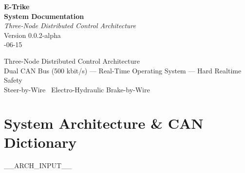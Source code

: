 \documentclass[12pt,a4paper,oneside]{report}
\begin{document}

\thispagestyle{empty}

\vspace*{60mm}

\begin{center}
  {\fontsize{28}{34}\selectfont\textbf{E-Trike}}\\[8mm]
  {\fontsize{22}{28}\selectfont\textbf{System Documentation}}\\[20mm]
  {\fontsize{14}{18}\selectfont\textit{Three-Node Distributed Control Architecture}}\\[30mm]
  {\fontsize{12}{15}\selectfont Version 0.0.2-alpha}\\[4mm]
  {\fontsize{11}{14}-06-15}
\end{center}

\vfill

\begin{center}
  {\footnotesize
  Three-Node Distributed Control Architecture\\[2mm]
  Dual CAN Bus (500 kbit/s) --- Real-Time Operating System --- Hard Realtime Safety\\[2mm]
  Steer-by-Wire \textbullet\ Electro-Hydraulic Brake-by-Wire
  }
\end{center}

\newpage


\setcounter{tocdepth}{1}
\tableofcontents
\newpage


\part{System Architecture \& CAN Dictionary}
\label{part:architecture}

__ARCH_INPUT__

\end{document}
